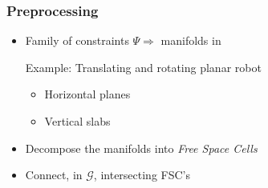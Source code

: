 \documentclass{beamer}
\begin{document}
\begin{frame}
  \frametitle{Preprocessing}
  \begin{itemize}
  \item Family of constraints \(\Psi \Rightarrow\) manifolds in \cspace{}

    Example: Translating and rotating planar robot
    \begin{itemize}
    \item Horizontal planes
    \item Vertical slabs
    \end{itemize}
  \item Decompose the manifolds into \emph{Free Space Cells}
  \item Connect, in \(\mathcal{G}\), intersecting FSC's
  \end{itemize}
  \begin{center}
  \end{center}
\end{frame}
\end{document}

